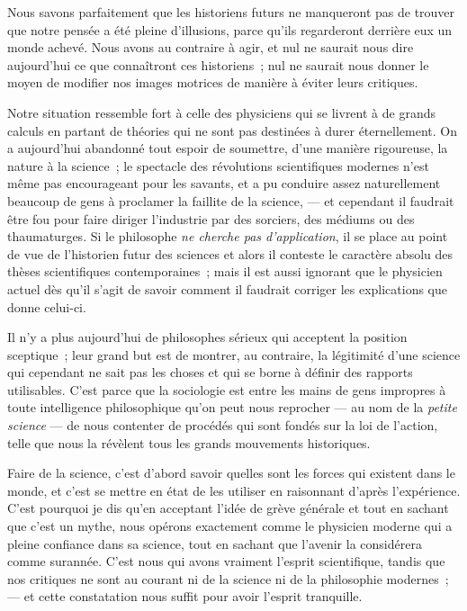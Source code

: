 \documentclass[french,twoside]{book} %
\begin{document}
\noindent Nous savons parfaitement que les historiens futurs ne manqueront pas de trouver que notre pensée a été pleine d’illusions, parce qu’ils regarderont derrière eux un monde achevé. Nous avons au contraire à agir, et nul ne saurait nous dire aujourd’hui ce que connaîtront ces historiens ; nul ne saurait nous donner le moyen de modifier nos images motrices de manière à éviter leurs critiques.\par
 Notre situation ressemble fort à celle des physiciens qui se livrent à de grands calculs en partant de théories qui ne sont pas destinées à durer éternellement. On a aujourd’hui abandonné tout espoir de soumettre, d’une manière rigoureuse, la nature à la science ; le spectacle des révolutions scientifiques modernes n’est même pas encourageant pour les savants, et a pu conduire assez naturellement beaucoup de gens à proclamer la faillite de la science, — et cependant il faudrait être fou pour faire diriger l’industrie par des sorciers, des médiums ou des thaumaturges. Si le philosophe \emph{ne cherche pas d’application}, il se place au point de vue de l’historien futur des sciences et alors il conteste le caractère absolu des thèses scientifiques contemporaines ; mais il est aussi ignorant que le physicien actuel dès qu’il s’agit de savoir comment il faudrait corriger les explications que donne celui-ci.\par
Il n’y a plus aujourd’hui de philosophes sérieux qui acceptent la position sceptique ; leur grand but est de montrer, au contraire, la légitimité d’une science qui cependant ne sait pas les choses et qui se borne à définir des rapports utilisables. C’est parce que la sociologie est entre les mains de gens impropres à toute intelligence philosophique qu’on peut nous reprocher — au nom de la \emph{petite science} — de nous contenter de procédés qui sont fondés sur la loi de l’action, telle que nous la révèlent tous les grands mouvements historiques.\par
Faire de la science, c’est d’abord savoir quelles sont les forces qui existent dans le monde, et c’est se mettre en état de les utiliser en raisonnant d’après l’expérience. C’est pourquoi je dis qu’en acceptant l’idée de grève générale et tout en sachant que c’est un mythe, nous opérons  exactement comme le physicien moderne qui a pleine confiance dans sa science, tout en sachant que l’avenir la considérera comme surannée. C’est nous qui avons vraiment l’esprit scientifique, tandis que nos critiques ne sont au courant ni de la science ni de la philosophie modernes ; — et cette constatation nous suffit pour avoir l’esprit tranquille.\par
\end{document}
